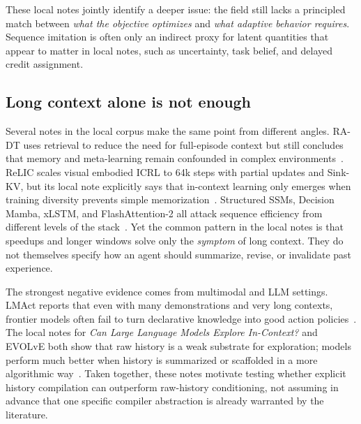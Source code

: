 \documentclass[10pt,twocolumn,letterpaper]{article}
\begin{document}
These local notes jointly identify a deeper issue: the field still lacks a principled match between \emph{what the objective optimizes} and \emph{what adaptive behavior requires}. Sequence imitation is often only an indirect proxy for latent quantities that appear to matter in local notes, such as uncertainty, task belief, and delayed credit assignment.

\subsection{Long context alone is not enough}
Several notes in the local corpus make the same point from different angles. RA-DT uses retrieval to reduce the need for full-episode context but still concludes that memory and meta-learning remain confounded in complex environments~\cite{schmied2024radt}. ReLIC scales visual embodied ICRL to 64k steps with partial updates and Sink-KV, but its local note explicitly says that in-context learning only emerges when training diversity prevents simple memorization~\cite{elawady2024relic}. Structured SSMs, Decision Mamba, xLSTM, and FlashAttention-2 all attack sequence efficiency from different levels of the stack~\cite{lu2023ssmrl,huang2024decisionmamba,beck2024xlstm,dao2023flashattention2}. Yet the common pattern in the local notes is that speedups and longer windows solve only the \emph{symptom} of long context. They do not themselves specify how an agent should summarize, revise, or invalidate past experience.

The strongest negative evidence comes from multimodal and LLM settings. LMAct reports that even with many demonstrations and very long contexts, frontier models often fail to turn declarative knowledge into good action policies~\cite{ruoss2024lmact}. The local notes for \emph{Can Large Language Models Explore In-Context?} and EVOLvE both show that raw history is a weak substrate for exploration; models perform much better when history is summarized or scaffolded in a more algorithmic way~\cite{krishnamurthy2024explore,nie2024evolve}. Taken together, these notes motivate testing whether explicit history compilation can outperform raw-history conditioning, not assuming in advance that one specific compiler abstraction is already warranted by the literature.
\end{document}
